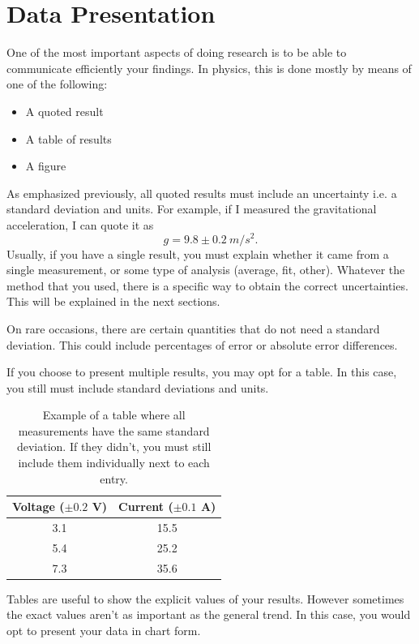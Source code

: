\documentclass[12pt]{report}
\begin{document}
\section{Data Presentation} \label{Sec:Data-presentation}
One of the most important aspects of doing research is to be able to communicate efficiently your findings. In physics, this is done mostly by means of one of the following:
\begin{itemize}
\item A quoted result
\item A table of results
\item A figure
\end{itemize}

As emphasized previously, all quoted results must include an uncertainty i.e. a standard deviation and units. For example, if I measured the gravitational acceleration, I can quote it as
\begin{equation}
g = 9.8 \pm 0.2 \ m/s^2.
\end{equation}
Usually, if you have a single result, you must explain whether it came from a single measurement, or some type of analysis (average, fit, other).
Whatever the method that you used, there is a specific way to obtain the correct uncertainties. This will be explained in the next sections.

On rare occasions, there are certain quantities that do not need a standard deviation. This could include percentages of error or absolute error differences.

If you choose to present multiple results, you may opt for a table. In this case, you still must include standard deviations and units.
\begin{table}[h]
\centering
\begin{tabular}{||c|c||}
\hline
Voltage ($\pm 0.2$ V) & Current ($\pm 0.1$ A) \\ \hline
3.1 & 15.5 \\
5.4 & 25.2 \\
7.3 & 35.6 \\ \hline
\end{tabular}
\caption{Example of a table where all measurements have the same standard deviation. If they didn't, you must still include them individually next to each entry.}
\label{Table:Presentation-Example}
\end{table}

Tables are useful to show the explicit values of your results. However sometimes the exact values aren't as important as the general trend. In this case, you would opt to present your data in chart form.
\end{document}
